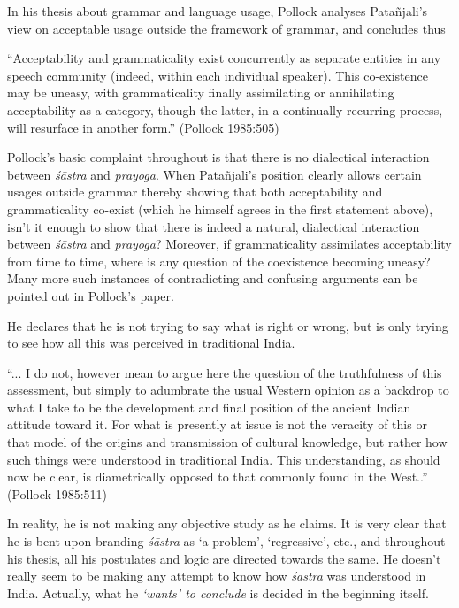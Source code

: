 In his thesis about grammar and language usage, Pollock analyses Patañjali’s view on acceptable usage outside the framework of grammar, and concludes thus
\begin{myquote}
``Acceptability and grammaticality exist concurrently as separate entities in any speech community (indeed, within each individual speaker). This co-existence may be uneasy, with grammaticality finally assimilating or annihilating acceptability as a category, though the latter, in a continually recurring process, will resurface in another form.'' (Pollock 1985:505)
\end{myquote}

Pollock's basic complaint throughout is that there is no dialectical interaction between {\it śāstra} and {\it prayoga}. When Patañjali’s position clearly allows certain usages outside grammar thereby showing that both acceptability and grammaticality co-exist (which he himself agrees in the first statement above), isn't it enough to show that there is indeed a natural, dialectical interaction between {\it śāstra} and {\it prayoga}? Moreover, if grammaticality assimilates acceptability from time to time, where is any question of the coexistence becoming uneasy? Many more such instances of contradicting and confusing arguments can be pointed out in Pollock's paper.

He declares that he is not trying to say what is right or wrong, but is only trying to see how all this was perceived in traditional India. 
\begin{myquote}
``... I do not, however mean to argue here the question of the truthfulness of this assessment, but simply to adumbrate the usual Western opinion as a backdrop to what I take to be the development and final position of the ancient Indian attitude toward it. For what is presently at issue is not the veracity of this or that model of the origins and transmission of cultural knowledge, but rather how such things were understood in traditional India. This understanding, as should now be clear, is diametrically opposed to that commonly found in the West..'' (Pollock 1985:511)
\end{myquote}

In reality, he is not making any objective study as he claims. It is very clear that he is bent upon branding {\it śāstra} as `a problem', `regressive', etc., and throughout his thesis, all his postulates and logic are directed towards the same. He doesn't really seem to be making any attempt to know how {\it śāstra} was understood in India. Actually, what he \textit{`wants' to conclude} is decided in the beginning itself. 

